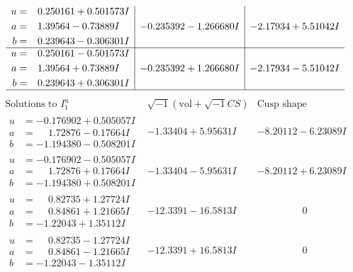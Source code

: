 \documentclass[1p]{elsarticle_modified}
\theoremstyle{definition}
\newcommand{\I}{\sqrt{-1}}
\begin{document}
$$\begin{array}{c|c|c}
\begin{aligned}
u &= \phantom{-}0.250161 + 0.501573 I \\
a &= \phantom{-}1.39564 - 0.73889 I \\
b &= \phantom{-}0.239643 - 0.306301 I\end{aligned}
 & -0.235392 - 1.266680 I & -2.17934 + 5.51042 I \\ \hline\begin{aligned}
u &= \phantom{-}0.250161 - 0.501573 I \\
a &= \phantom{-}1.39564 + 0.73889 I \\
b &= \phantom{-}0.239643 + 0.306301 I\end{aligned}
 & -0.235392 + 1.266680 I & -2.17934 - 5.51042 I\\
 \hline 
 \end{array}$$\newpage$$\begin{array}{c|c|c}  
\text{Solutions to }I^u_{1}& \I (\text{vol} + \sqrt{-1}CS) & \text{Cusp shape}\\
 \hline 
\begin{aligned}
u &= -0.176902 + 0.505057 I \\
a &= \phantom{-}1.72876 - 0.17664 I \\
b &= -1.194380 - 0.508201 I\end{aligned}
 & -1.33404 + 5.95631 I & -8.20112 - 6.23089 I \\ \hline\begin{aligned}
u &= -0.176902 - 0.505057 I \\
a &= \phantom{-}1.72876 + 0.17664 I \\
b &= -1.194380 + 0.508201 I\end{aligned}
 & -1.33404 - 5.95631 I & -8.20112 + 6.23089 I \\ \hline\begin{aligned}
u &= \phantom{-}0.82735 + 1.27724 I \\
a &= \phantom{-}0.84861 + 1.21665 I \\
b &= -1.22043 + 1.35112 I\end{aligned}
 & -12.3391 - 16.5813 I & \phantom{-0.000000 } 0 \\ \hline\begin{aligned}
u &= \phantom{-}0.82735 - 1.27724 I \\
a &= \phantom{-}0.84861 - 1.21665 I \\
b &= -1.22043 - 1.35112 I\end{aligned}
 & -12.3391 + 16.5813 I & \phantom{-0.000000 } 0 \\ \hline\begin{aligned}

\end{aligned}
\end{array}$$
\end{document}
